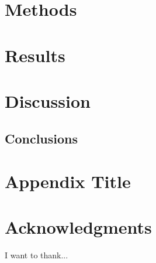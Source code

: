 \documentclass[english,12pt]{report}
\begin{document}
\chapter{Methods}


\chapter{Results}


\chapter{Discussion}


\section{Conclusions}

{\small
}

\appendix
\chapter{Appendix Title}


\chapter*{Acknowledgments}
I want to thank...
\end{document}
